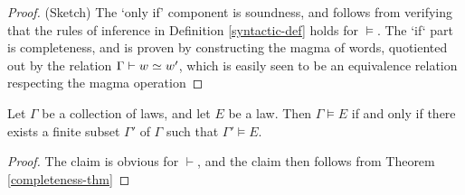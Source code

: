 \begin{proof} (Sketch) The `only if' component is soundness, and follows from verifying that the rules of inference in Definition \ref{syntactic-def} holds for $\models$.  The `if` part is completeness, and is proven by constructing the magma of words, quotiented out by the relation $\Gamma \vdash w \simeq w'$, which is easily seen to be an equivalence relation respecting the magma operation
\end{proof}

\begin{corollary}\label{compactness-thm}  Let $\Gamma$ be a collection of laws, and let $E$ be a law.  Then $\Gamma \models E$ if and only if there exists a finite subset $\Gamma'$ of $\Gamma$ such that $\Gamma' \models E$.
\end{corollary}

\begin{proof} The claim is obvious for $\vdash$, and the claim then follows from Theorem \ref{completeness-thm}
\end{proof}
